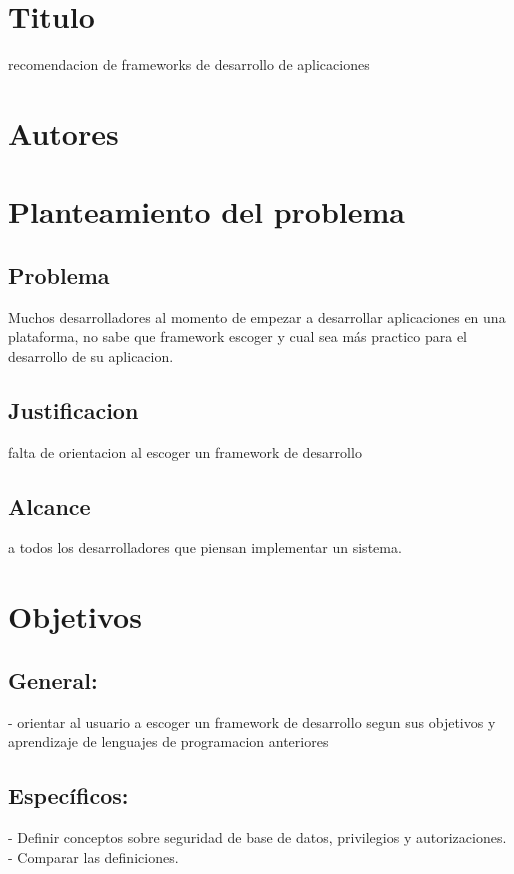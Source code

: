 \documentclass[%
 reprint,
 amsmath,amssymb,
 aps,
]{revtex4-1}
\begin{document}


\section {Titulo}\label{sec:1}

    recomendacion de frameworks de desarrollo de aplicaciones
\section{Autores}\label{sec:2}


\section {Planteamiento del problema}

\subsection{Problema}
Muchos desarrolladores al momento de empezar a desarrollar aplicaciones en una plataforma, no sabe que framework escoger y cual sea más practico para el desarrollo de su aplicacion.

\subsection{Justificacion}
falta de orientacion al escoger un framework de desarrollo
\subsection{Alcance}
a todos los desarrolladores que piensan implementar un sistema.

\section{Objetivos}\label{sec:2}
\subsection{General:}
-  orientar al usuario a escoger un framework de desarrollo segun sus objetivos y aprendizaje de lenguajes de programacion anteriores
\subsection{Específicos:}
-  Definir conceptos sobre seguridad de base de datos, privilegios y autorizaciones.\\
- Comparar las definiciones.
\end{document}
